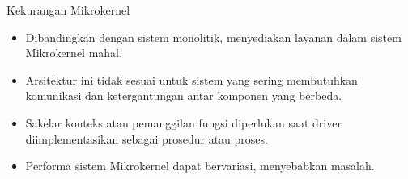 \documentclass{beamer}
\begin{document}
	\begin{frame}{Kekurangan Mikrokernel}
	
	\begin{itemize}
		\item Dibandingkan dengan sistem monolitik, menyediakan layanan dalam sistem Mikrokernel mahal.
		
		\item Arsitektur ini tidak sesuai untuk sistem yang sering membutuhkan komunikasi dan ketergantungan antar komponen yang berbeda.
		
		\item Sakelar konteks atau pemanggilan fungsi diperlukan saat driver diimplementasikan sebagai prosedur atau proses.
		
		\item Performa sistem Mikrokernel dapat bervariasi, menyebabkan masalah.
	\end{itemize}
\end{frame}
\end{document}
